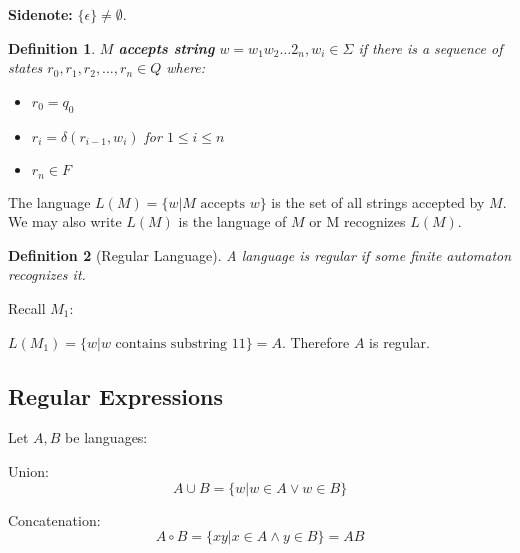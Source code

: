 \documentclass[12pt]{article}
\newtheorem{definition}{Definition}
\begin{document}
\noindent 
\textbf{Sidenote:} \(\{\epsilon\} \neq \emptyset\).

\begin{definition}
    \(M\) \textbf{accepts string} \(w = w_1 w_2 \dots 2_n, w_i \in \Sigma\) if there 
    is a sequence of states \(r_0,r_1,r_2,\dots,r_n \in Q\) where: 
    \begin{itemize}
        \item \(r_0 = q_0\)
        \item \(r_i = \delta(r_{i-1}, w_i)\) for \(1 \leq i \leq n\)
        \item \(r_n \in F\)
    \end{itemize}
\end{definition}

\noindent 
The language \(L(M) = \{w | M \text{ accepts } w\}\) is the set of all 
strings accepted by \(M\). We may also write \(L(M)\) is the language of \(M\) or 
M recognizes \(L(M)\).

\begin{definition}[Regular Language]
    A language is regular if some finite automaton recognizes it.  
\end{definition}

\noindent 
Recall \(M_1\): 


\noindent 
\(L(M_1) = \{w|w \text{ contains substring } 11\} = A\). 
Therefore \(A\) is regular.

\subsection*{Regular Expressions} 
Let \(A,B\) be languages: 

\noindent 
Union:
\[ 
    A \cup B = \{w|w\in A \lor w\in B\}
\]

\noindent 
Concatenation: 
\[  
    A \circ B = \{xy|x\in A \land y\in B\} = AB
\]
\end{document}
